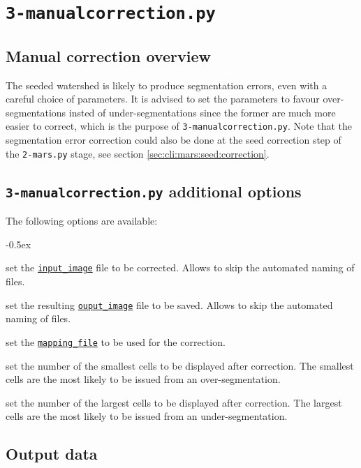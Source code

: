 \section{\texttt{3-manualcorrection.py}}
\label{sec:cli:manual:correction}

\subsection{Manual correction overview}

The seeded watershed is likely to produce segmentation errors, even with a careful choice of parameters. It is advised to set the parameters to favour over-segmentations insted of under-segmentations since the former are much more easier to correct, which is the purpose of \texttt{3-manualcorrection.py}. 
Note that the segmentation error correction could also be done at the seed correction step of the \texttt{2-mars.py} stage, see section \ref{sec:cli:mars:seed:correction}.


\subsection{\texttt{3-manualcorrection.py} additional options}

The following options are available:
\begin{description}
 \itemsep -0.5ex
\item[\texttt{-i \underline{input\_image}}] set the \texttt{\underline{input\_image}} file to be corrected. Allows to skip the automated naming of files.
  \item[\texttt{-o \underline{output\_image}}] set the resulting \texttt{\underline{ouput\_image}} file to be saved. Allows to skip the automated naming of files. 
\item[\texttt{-m \underline{mapping\_file}}] set the \texttt{\underline{mapping\_file}} to be used for the correction.
\item[\texttt{-nsc \underline{smallest\_cells}}] set the number of the smallest cells to be displayed after correction. The smallest cells are the most likely to be issued from an over-segmentation.
\item[\texttt{-nlc \underline{largest\_cells}}] set the number of the largest cells to be displayed after correction. The largest cells are the most likely to be issued from an under-segmentation.  
\end{description}



\subsection{Output data}

